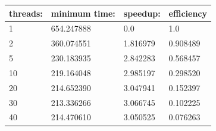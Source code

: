 \documentclass[a4paper,12pt]{article}
\begin{document}
\begin{center}
\begin{tabular}{| l | l | l | l |} \hline
    threads: & minimum time: & speedup: & efficiency\\ \hline
1 & 654.247888 & 0.0 & 1.0 \\ \hline
2 & 360.074551 & 1.816979 & 0.908489 \\ \hline
5 & 230.183935 & 2.842283 & 0.568457 \\ \hline
10 & 219.164048 & 2.985197 & 0.298520 \\ \hline
20 & 214.652390 & 3.047941 & 0.152397 \\ \hline
30 & 213.336266 & 3.066745 & 0.102225 \\ \hline
40 & 214.470610 & 3.050525 & 0.076263 \\ \hline
\end{tabular}
\end{center}
\end{document}

